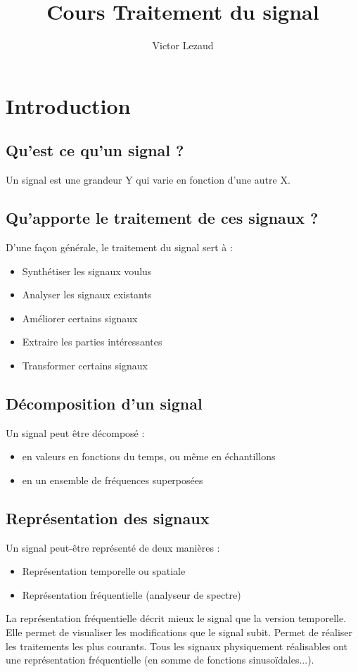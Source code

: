 \documentclass[10pt,a4paper,twoside]{article}
\author{Victor Lezaud}
\title{Cours Traitement du signal}
\begin{document}
\maketitle
\renewcommand{\contentsname}{Sommaire}
\tableofcontents

\newpage
\section{Introduction}
\subsection{Qu'est ce qu'un signal ?}
Un signal est une grandeur Y qui varie en fonction d'une autre X.

\subsection{Qu'apporte le traitement de ces signaux ?}
D'une façon générale, le traitement du signal sert à :
\begin{itemize}
\item Synthétiser les signaux voulus
\item Analyser les signaux existants
\item Améliorer certains signaux
\item Extraire les parties intéressantes
\item Transformer certains signaux
\end{itemize}

\subsection{Décomposition d'un signal}
Un signal peut être décomposé :
\begin{itemize}
\item en valeurs en fonctions du temps, ou même en échantillons
\item en un ensemble de fréquences superposées
\end{itemize}

\subsection{Représentation des signaux}
Un signal peut-être représenté de deux manières :
\begin{itemize}
\item Représentation temporelle ou spatiale
\item Représentation fréquentielle (analyseur de spectre)
\end{itemize}
La représentation fréquentielle décrit mieux le signal que la version temporelle. Elle permet de visualiser les modifications que le signal subit. Permet de réaliser les traitements les plus courants. Tous les signaux physiquement réalisables ont une représentation fréquentielle (en somme de fonctions sinusoïdales...).
\end{document}
